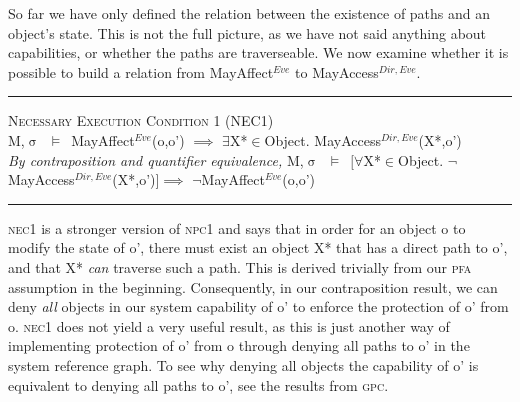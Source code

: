 \documentclass[a4paper,11pt, twoside,twocolumn]{article}
\newenvironment{logic}[1][null]
{\begin{flushleft} \small \label{#1}}
{\end{flushleft}}
\newcommand{\loin}{$\in$}
\newcommand{\loforall}{$\forall$}
\newcommand{\loexists}{$\exists$}
\newcommand{\loimplies}{$\implies$}
\newcommand{\losigma}{$\upsigma$}
\newcommand{\loturns} {$\vDash$}
\newcommand{\loneg}{$\neg$}
\newcommand{\ablock} {\null\qquad}
\begin{document}
So far we have only defined the relation between the existence of paths and an object's state. This is not the full picture, as we have not said anything about capabilities, or whether the paths are traverseable. We now examine whether it is possible to build a relation from MayAffect$^{Eve}$ to MayAccess$^{Dir,Eve}$.
\begin{logic}
\hrule\null
\textsc{\normalsize *Necessary Execution Condition 1 (NEC1)}\\
M,\losigma\ \loturns\ MayAffect$^{Eve}$(o,o') \loimplies\linebreak
	\ablock \loexists X*\loin{Object}. MayAccess$^{Dir,Eve}$(X*,o') 
\linebreak\\
\textit{By contraposition and quantifier equivalence,}\linebreak
M,\losigma\ \loturns\ $[$\loforall X*\loin{Object}. \loneg MayAccess$^{Dir,Eve}$(X*,o')$]$\loimplies\linebreak
	\ablock \loneg MayAffect$^{Eve}$(o,o') \linebreak
\hrule
\end{logic}
\textsc{nec1} is a stronger version of \textsc{npc1} and says that in order for an object o to modify the state of o', there must exist an object X* that has a direct path to o', and that X* \textit{can} traverse such a path. This is derived trivially from our \textsc{pfa} assumption in the beginning. Consequently, in our contraposition result, we can deny \textit{all} objects in our system capability of o' to enforce the protection of o' from o. \textsc{nec1} does not yield a very useful result, as this is just another way of implementing protection of o' from o through denying all paths to o' in the system reference graph. To see why denying all objects the capability of o' is equivalent to denying all paths to o', see the results from \textsc{gpc}.\\
\end{document}
